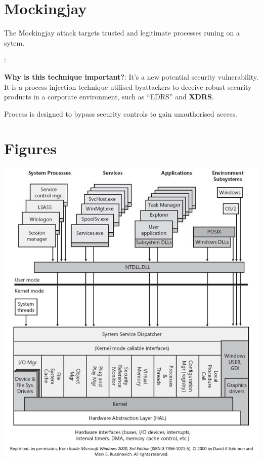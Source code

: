 \documentclass{article}
\begin{document}
\section{Mockingjay}

The Mockingjay  attack targets trusted and legitimate processes runing on a sytem.  

\textbf{}: \textcite{Peixoto:2023}

\textbf{Why is this technique important?}: It's a new potential security vulnerability. It is a process injection
technique utilised byattackers to deceive robust security products in a corporate environment, such as ``EDRS'' and \textbf{XDRS}.

Process is designed to bypass security controls to gain unauthorised access.

\section{Figures}

\includegraphics[scale=0.4]{ms_hardware_interfaces.png}

\printbibliography
\end{document}
